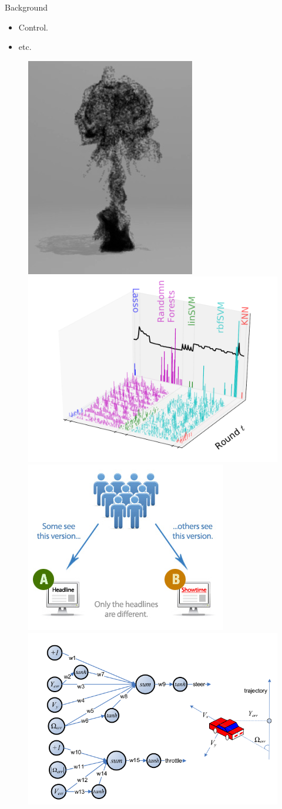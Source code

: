 \documentclass[final]{beamer}
\begin{document}
\begin{frame}[t]
\begin{columns}[T]
\begin{column}{.48\textwidth}
\begin{block}{Background}
\begin{minipage}[l]{0.63\columnwidth}
\begin{itemize}
   \item Control.
   \item etc.
   \end{itemize}
    \end{minipage}
  \begin{minipage}[r]{0.35\columnwidth}
     \begin{figure}[t]
      \includegraphics[width=0.45\columnwidth]{../Presentation/figs/animation}  
      \includegraphics[width=0.55\columnwidth]{../Presentation/figs/wine_arms_EI_T40} \\
      \includegraphics[width=0.45\columnwidth]{../Presentation/figs/abtest}
      \includegraphics[width=0.55\columnwidth]{../Presentation/figs/control}

\end{figure}
\end{minipage}
\end{block}
\end{column}
\end{columns}
\end{frame}
\end{document}
